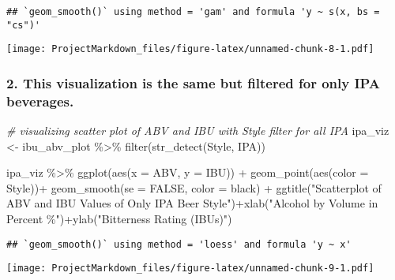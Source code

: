 \documentclass[
]{article}
\newenvironment{Shaded}{\begin{snugshade}}{\end{snugshade}}
\newcommand{\AttributeTok}[1]{\textcolor[rgb]{0.77,0.63,0.00}{#1}}
\newcommand{\CommentTok}[1]{\textcolor[rgb]{0.56,0.35,0.01}{\textit{#1}}}
\newcommand{\ConstantTok}[1]{\textcolor[rgb]{0.00,0.00,0.00}{#1}}
\newcommand{\FunctionTok}[1]{\textcolor[rgb]{0.00,0.00,0.00}{#1}}
\newcommand{\NormalTok}[1]{#1}
\newcommand{\OtherTok}[1]{\textcolor[rgb]{0.56,0.35,0.01}{#1}}
\newcommand{\SpecialCharTok}[1]{\textcolor[rgb]{0.00,0.00,0.00}{#1}}
\newcommand{\StringTok}[1]{\textcolor[rgb]{0.31,0.60,0.02}{#1}}
\begin{document}
\begin{verbatim}
## `geom_smooth()` using method = 'gam' and formula 'y ~ s(x, bs = "cs")'
\end{verbatim}

\texttt{[image: ProjectMarkdown\_files/figure-latex/unnamed-chunk-8-1.pdf]}

\hypertarget{this-visualization-is-the-same-but-filtered-for-only-ipa-beverages.}{%
\subsubsection{2. This visualization is the same but filtered for only
IPA
beverages.}\label{this-visualization-is-the-same-but-filtered-for-only-ipa-beverages.}}

\begin{Shaded}
\begin{Highlighting}[]
\CommentTok{\# visualizing scatter plot of ABV and IBU with Style filter for all IPA }
\NormalTok{ipa\_viz }\OtherTok{\textless{}{-}}\NormalTok{ ibu\_abv\_plot }\SpecialCharTok{\%\textgreater{}\%} \FunctionTok{filter}\NormalTok{(}\FunctionTok{str\_detect}\NormalTok{(Style, }\StringTok{\textquotesingle{}IPA\textquotesingle{}}\NormalTok{))}

\NormalTok{ipa\_viz }\SpecialCharTok{\%\textgreater{}\%} \FunctionTok{ggplot}\NormalTok{(}\FunctionTok{aes}\NormalTok{(}\AttributeTok{x =}\NormalTok{ ABV, }\AttributeTok{y =}\NormalTok{ IBU)) }\SpecialCharTok{+}
  \FunctionTok{geom\_point}\NormalTok{(}\FunctionTok{aes}\NormalTok{(}\AttributeTok{color =}\NormalTok{ Style))}\SpecialCharTok{+}
  \FunctionTok{geom\_smooth}\NormalTok{(}\AttributeTok{se =} \ConstantTok{FALSE}\NormalTok{, }\AttributeTok{color =} \StringTok{\textquotesingle{}black\textquotesingle{}}\NormalTok{) }\SpecialCharTok{+}
  \FunctionTok{ggtitle}\NormalTok{(}\StringTok{"Scatterplot of ABV and IBU Values of Only IPA Beer Style"}\NormalTok{)}\SpecialCharTok{+}\FunctionTok{xlab}\NormalTok{(}\StringTok{"Alcohol by Volume in Percent \%"}\NormalTok{)}\SpecialCharTok{+}\FunctionTok{ylab}\NormalTok{(}\StringTok{"Bitterness Rating (IBUs)"}\NormalTok{)}
\end{Highlighting}
\end{Shaded}

\begin{verbatim}
## `geom_smooth()` using method = 'loess' and formula 'y ~ x'
\end{verbatim}

\texttt{[image: ProjectMarkdown\_files/figure-latex/unnamed-chunk-9-1.pdf]}
\end{document}
